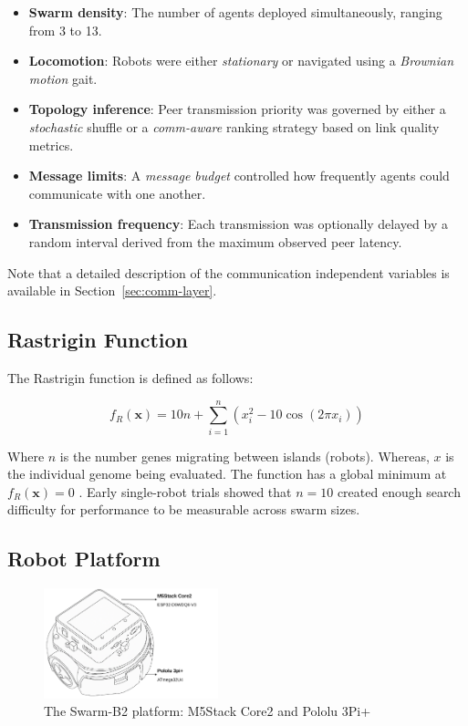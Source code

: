 \documentclass[conference]{IEEEtran}
\begin{document}
\begin{itemize}
  \item \textbf{Swarm density}: The number of agents deployed simultaneously, ranging from 3 to 13.
  \item \textbf{Locomotion}: Robots were either \emph{stationary} or navigated using a \emph{Brownian motion} gait.
  \item \textbf{Topology inference}: Peer transmission priority was governed by either a \emph{stochastic} shuffle or a \emph{comm-aware} ranking strategy based on link quality metrics.
  \item \textbf{Message limits}: A \emph{message budget} controlled how frequently agents could communicate with one another.
  \item \textbf{Transmission frequency}: Each transmission was optionally delayed by a random interval derived from the maximum observed peer latency.
\end{itemize}

Note that a detailed description of the communication independent variables is available in Section~\ref{sec:comm-layer}.

\subsection{Rastrigin Function}
The Rastrigin function is defined as follows:

\begin{equation}\label{eq:rastrigin}
f_R(\mathbf{x}) = 10n + \sum_{i=1}^{n} \left(x_i^2 - 10\cos(2\pi x_i)\right)
\end{equation}

Where $n$ is the number genes migrating between islands (robots). Whereas, $x$ is the individual genome being evaluated. The function has a global minimum at \( f_R(\mathbf{x}) = 0 \) \cite{rucinski_impact_2010}. Early single-robot trials showed that $n=10$ created enough search difficulty for performance to be measurable across swarm sizes.

\subsection{Robot Platform}\label{sec:robot_platform}
\begin{figure}[h]
    \centering
    \includegraphics[width=0.45\textwidth]{B2.pdf}
    \caption{The Swarm-B2 platform: M5Stack Core2 and Pololu 3Pi+}
    \label{fig:B2}
\end{figure}
\end{document}
